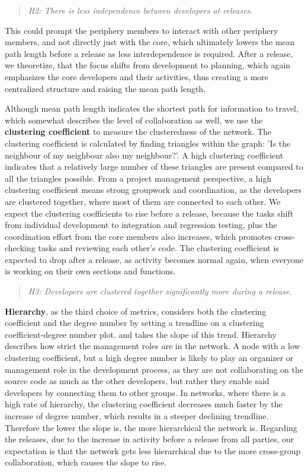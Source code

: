 \begin{quote}
    \textit{H2: There is less independence between developers at releases.}
\end{quote}

This could prompt the periphery members to interact with other periphery members, and not directly just with the core, which ultimately lowers the mean path length before a release as less interdependence is required. After a release, we theoretize, that the focus shifts from development to planning, which again emphasizes the core developers and their activities, thus creating a more centralized structure and raising the mean path length.

Although mean path length indicates the shortest path for information to travel, which somewhat describes the level of collaboration as well, we use the \textbf{clustering coefficient} to measure the clusteredness of the network. The clustering coefficient is calculated by finding triangles within the graph: 'Is the neighbour of my neighbour also my neighbour?'. A high clustering coefficient indicates that a relatively large number of these triangles are present compared to all the triangles possible. From a project management perspective, a high clustering coefficient means strong groupwork and coordination, as the developers are clustered together, where most of them are connected to each other. We expect the clustering coefficients to rise before a release, because the tasks shift from individual development to integration and regression testing, plus the coordination effort from the core members also increases, which promotes cross-checking tasks and reviewing each other's code. The clustering coefficient is expected to drop after a release, as activity becomes normal again, when everyone is working on their own sections and functions.


\begin{quote}
    \textit{H3: Developers are clustered together significantly more during a release.}
\end{quote}


\textbf{Hierarchy}, as the third choice of metrics, considers both the clustering coefficient and the degree number by setting a trendline on a clustering coefficient-degree number plot, and takes the slope of this trend. Hierarchy describes how strict the management roles are in the network. A node with a low clustering coefficient, but a high degree number is likely to play an organizer or management role in the development process, as they are not collaborating on the source code as much as the other developers, but rather they enable said developers by connecting them to other groups. In networks, where there is a high rate of hierarchy, the clustering coefficient decreases much faster by the increase of degree number, which results in a steeper declining trendline. Therefore the lower the slope is, the more hierarchical the network is. Regarding the releases, due to the increase in activity before a release from all parties, our expectation is that the network gets less hierarchical due to the more cross-group collaboration, which causes the slope to rise. 


